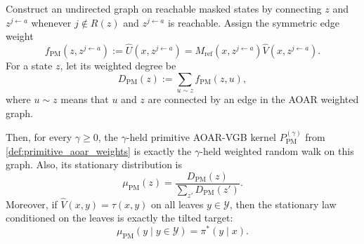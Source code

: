 \documentclass{article}
\numberwithin{theorem}{section}
\numberwithin{proposition}{section}
\numberwithin{corollary}{section}
\numberwithin{lemma}{section}
\numberwithin{conjecture}{section}
\numberwithin{remark}{section}
\numberwithin{definition}{section}
\numberwithin{assumption}{section}
\numberwithin{example}{section}
\newcommand{\calY}{{\mathcal{Y}}}
\begin{document}
\begin{theorem}
\label{thm:primitive_weighted_graph}
Construct an undirected graph on reachable masked states by connecting $z$ and $z^{j\leftarrow a}$ whenever $j\notin R(z)$ and $z^{j\leftarrow a}$ is reachable. Assign the symmetric edge weight
\begin{equation*}
    f_{\mathrm{PM}}(z,z^{j\leftarrow a}) := \widehat U(x,z^{j\leftarrow a}) = M_{\text{ref}}(x,z^{j\leftarrow a})\widehat V(x,z^{j\leftarrow a}).
\end{equation*}
For a state $z$, let its weighted degree be
\begin{equation*}
    D_{\mathrm{PM}}(z) := \sum_{u\sim z} f_{\mathrm{PM}}(z,u),
\end{equation*}
where $u\sim z$ means that $u$ and $z$ are connected by an edge in the AOAR weighted graph.

Then, for every $\gamma\ge 0$, the $\gamma$-held primitive AOAR-VGB kernel $P_{\mathrm{PM}}^{(\gamma)}$ from \cref{def:primitive_aoar_weights} is exactly the $\gamma$-held weighted random walk on this graph. Also, its stationary distribution is
\begin{equation*}
    \mu_{\mathrm{PM}}(z) = \frac{D_{\mathrm{PM}}(z)}{\sum_{z'}D_{\mathrm{PM}}(z')}.
\end{equation*}
Moreover, if $\widehat V(x,y)=\tau(x,y)$ on all leaves $y\in\calY$, then the stationary law conditioned on the leaves is exactly the tilted target:
\begin{equation*}
    \mu_{\mathrm{PM}}(y\mid y\in\calY) = \pi^*(y\mid x).
\end{equation*}
\end{theorem}
\end{document}
